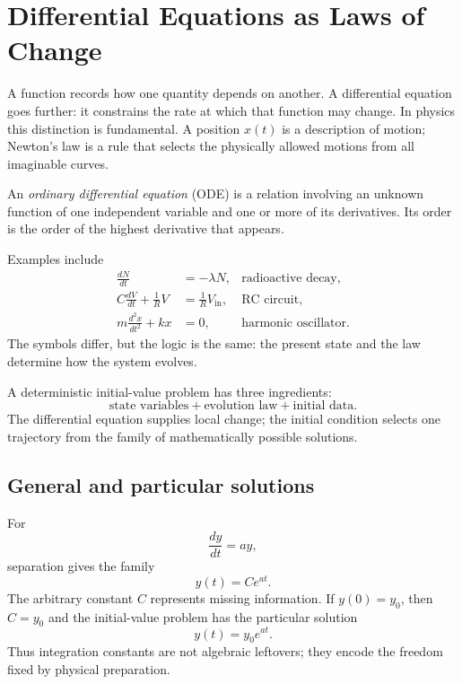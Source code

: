 \section{Differential Equations as Laws of Change}
\label{sec:ch4-laws-of-change}

A function records how one quantity depends on another. A differential equation goes further: it constrains the rate at which that function may change. In physics this distinction is fundamental. A position $x(t)$ is a description of motion; Newton's law is a rule that selects the physically allowed motions from all imaginable curves.

\begin{definitionbox}
An \emph{ordinary differential equation} (ODE) is a relation involving an unknown function of one independent variable and one or more of its derivatives. Its order is the order of the highest derivative that appears.
\end{definitionbox}

Examples include
\begin{align}
\frac{dN}{dt}&=-\lambda N, &\text{radioactive decay},\\
C\frac{dV}{dt}+\frac{1}{R}V&=\frac{1}{R}V_{\mathrm{in}}, &\text{RC circuit},\\
m\frac{d^2x}{dt^2}+kx&=0, &\text{harmonic oscillator}.
\end{align}
The symbols differ, but the logic is the same: the present state and the law determine how the system evolves.

\begin{keyidea}
A deterministic initial-value problem has three ingredients:
\[
\text{state variables}+\text{evolution law}+\text{initial data}.
\]
The differential equation supplies local change; the initial condition selects one trajectory from the family of mathematically possible solutions.
\end{keyidea}

\subsection{General and particular solutions}
For
\[
\frac{dy}{dt}=ay,
\]
separation gives the family
\[
y(t)=Ce^{at}.
\]
The arbitrary constant $C$ represents missing information. If $y(0)=y_0$, then $C=y_0$ and the initial-value problem has the particular solution
\[
\boxed{y(t)=y_0e^{at}}.
\]
Thus integration constants are not algebraic leftovers; they encode the freedom fixed by physical preparation.

